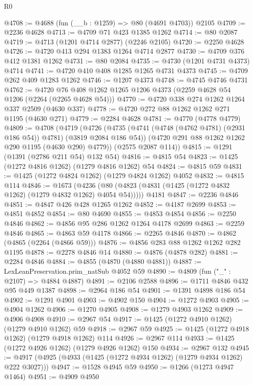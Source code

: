 \begin{lexlean}{R0}
\begin{coremodule}
@4708 := @4688 (fun (__b : @1259) => @80 (@4691 @4703)) @2105
@4709 := @2236 @4628
@4713 := @4709 @71 @423 @1385 @1262
@4714 := @80 @2087
@4719 := @4713 (@1201 @4714 @2877) (@2246 @2105)
@4720 := @2250 @4628
@4726 := @4720 @413 @294 @1383 @1264 @4714 @2877
@4730 := @4709 @376 @412 @1381 @1262
@4731 := @80 @2084
@4735 := @4730 (@1201 @4731 @4373) @4714
@4741 := @4720 @410 @408 @1285 @1265 @4731 @4373
@4745 := @4709 @262 @409 @1283 @1262
@4746 := @1207 @4373
@4748 := @4745 @4746 @4731
@4762 := @4720 @76 @408 @1262 @1265 @1206 @4373 (@2259 @4628 @54 @1206 (@2264 (@2265 @4628 @54)))
@4770 := @4720 @338 @274 @1262 @1264 @337 @2509 (@4630 @337)
@4778 := @4720 @272 @88 @1262 @1262 @271 @1195 (@4630 @271)
@4779 := @2284 @4628
@4781 := @4770 (@4778 @4779)
@4809 := @4708
    (@4719
      (@4726
        (@4735 (@4741 (@4748 (@4762 @4781) (@2931 @186 @54)) @4781) (@3819 @2084 @186 @54))
        (@4720 @291 @88 @1262 @1262 @290 @1195 (@4630 @290) @4779))
      (@2575 @2087 @114))
@4815 := @1291 (@1391 (@2786 @211 @54) @132 @54)
@4816 := @4815 @54
@4823 := @1425 (@1272 @4816 @1262) (@1279 @4816 @1262) @54
@4824 := @4815 @59
@4831 := @1425 (@1272 @4824 @1262) (@1279 @4824 @1262) @4052
@4832 := @4815 @114
@4846 := @1673
    (@4236 (@80 (@4823 (@4831 (@1425 (@1272 @4832 @1262) (@1279 @4832 @1262) @4054 @54)))))
    @4181
@4847 := @2236 @4846
@4851 := @4847 @426 @428 @1265 @1262
@4852 := @4187 @2699
@4853 := @4851 @4852
@4854 := @80 @4690
@4855 := @4853 @4854
@4856 := @2250 @4846
@4862 := @4856 @95 @286 @1262 @1264 @4178 @2699
@4863 := @2259 @4846
@4865 := @4863 @59 @4178
@4866 := @2265 @4846
@4870 := @4862 (@4865 (@2264 (@4866 @59)))
@4876 := @4856 @283 @88 @1262 @1262 @282 @1195
@4878 := @2278 @4846 @14
@4880 := @4876 (@4878 @282)
@4881 := @2284 @4846
@4884 := @4855 (@4870 (@4880 @4881))
@4887 := LexLeanPreservation.prim_natSub @4052 @59
@4890 := @4809 (fun ("_" : @2107) => @4884 @4887)
@4891 := @2106 @2588
@4896 := @1711 @4846 @432 @95 @449 @1387
@4898 := @2964 @186 @54
@4901 := @1391 @4898 @186 @54
@4902 := @1291 @4901
@4903 := @4902 @150
@4904 := @1272 @4903
@4905 := @4904 @1262
@4906 := @1270 @4905
@4908 := @1279 @4903 @1262
@4909 := @4906 @4908
@4910 := @2967 @54
@4917 := @1425 (@1272 @4910 @1262) (@1279 @4910 @1262) @59
@4918 := @2967 @59
@4925 := @1425 (@1272 @4918 @1262) (@1279 @4918 @1262) @114
@4926 := @2967 @114
@4933 := @1425 (@1272 @4926 @1262) (@1279 @4926 @1262) @150
@4934 := @2967 @132
@4945 := @4917 (@4925 (@4933 (@1425 (@1272 @4934 @1262) (@1279 @4934 @1262) @222 @3027)))
@4947 := @1528 @4945 @59
@4950 := @1266 (@1273 @4947 @1464)
@4951 := @4909 @4950

\end{coremodule}
\end{lexlean}
